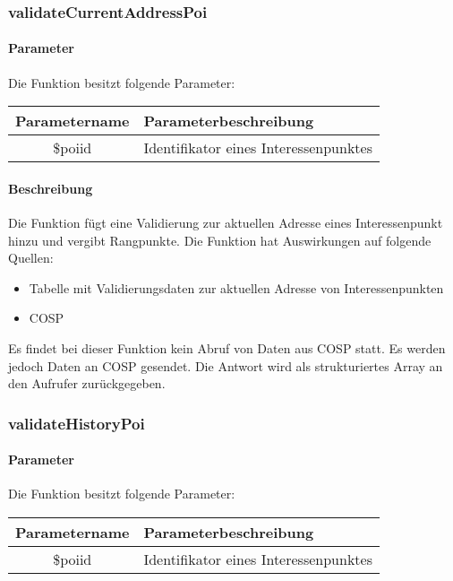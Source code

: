 \subsubsection{validateCurrentAddressPoi}
\paragraph{Parameter} Die Funktion besitzt folgende Parameter:
\begin{table}[H]
	\begin{tabular}{|c|p{11cm}|}
		\hline
		\textbf{Parametername} & \textbf{Parameterbeschreibung} \\ \hline
		\$poiid & Identifikator eines Interessenpunktes \\ \hline
	\end{tabular}
\end{table}
\paragraph{Beschreibung} Die Funktion fügt eine Validierung zur aktuellen Adresse eines Interessenpunkt hinzu und vergibt Rangpunkte. Die Funktion hat Auswirkungen auf folgende Quellen:
\begin{itemize}
	\item Tabelle mit Validierungsdaten zur aktuellen Adresse von Interessenpunkten
	\item COSP
\end{itemize}
Es findet bei dieser Funktion kein Abruf von Daten aus {\glqq COSP\grqq} statt. Es werden jedoch Daten an {\glqq COSP\grqq} gesendet. Die Antwort wird als strukturiertes Array an den Aufrufer zurückgegeben.
\subsubsection{validateHistoryPoi}
\paragraph{Parameter} Die Funktion besitzt folgende Parameter:
\begin{table}[H]
	\begin{tabular}{|c|p{11cm}|}
		\hline
		\textbf{Parametername} & \textbf{Parameterbeschreibung} \\ \hline
		\$poiid & Identifikator eines Interessenpunktes \\ \hline
	\end{tabular}
\end{table}
